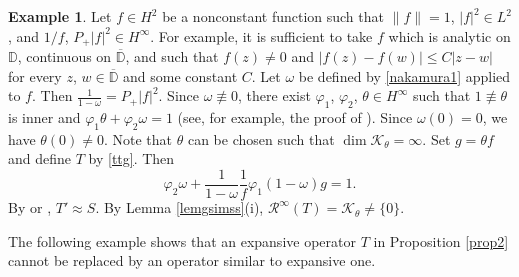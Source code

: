 \documentclass[a4paper,oneside,11pt]{amsart}
\numberwithin{equation}{section}
\theoremstyle{plain}
\theoremstyle{definition}
\newtheorem{example}[theorem]{Example}
\begin{document}
\begin{example}\label{exa54} Let $f\in H^2$ be a nonconstant  function such that $\|f\|=1$, $|f|^2\in L^2$, 
and $1/f$, $P_+|f|^2\in H^\infty$. 
For example,  it is sufficient to take  $f$ which is analytic on $\mathbb D$, continuous on $\overline{\mathbb D}$, and 
such that $f(z)\neq 0$ and $|f(z)-f(w)|\leq C|z-w|$ for every $z$, $w\in\overline{\mathbb D}$ and some constant $C$. Let $\omega$ be defined by \eqref{nakamura1} applied to $f$. 
Then $\frac{1}{1-\omega}=P_+|f|^2$. Since $\omega\not\equiv 0$,
 there exist $\varphi_1$, $\varphi_2$, $\theta\in H^\infty$ such that 
$1\not\equiv\theta$ is inner and $\varphi_1\theta+\varphi_2\omega=1$ (see, for example,
the proof of {\cite[Prop. 5.3] {gamal22}}). Since $\omega(0)=0$, we have $\theta(0)\neq 0$.  Note that $\theta$ can be chosen such that $\dim\mathcal K_\theta=\infty$.
 Set $g=\theta f$ and define $T$ by \eqref{ttg}. 
Then
\begin{equation*}  \varphi_2\omega+\frac{1}{1-\omega}\frac{1}{f}\varphi_1(1-\omega)g=1. \end{equation*}
 By \cite{nf73} or \cite{nf76}, 
$T'\approx S$. By Lemma \ref{lemgsimss}(i), $\mathcal R^\infty(T)=\mathcal K_\theta\neq \{0\}$.
\end{example}
 
The following example shows that an expansive operator $T$ in  Proposition \ref{prop2} cannot be replaced by  an operator similar to expansive one.
\end{document}
